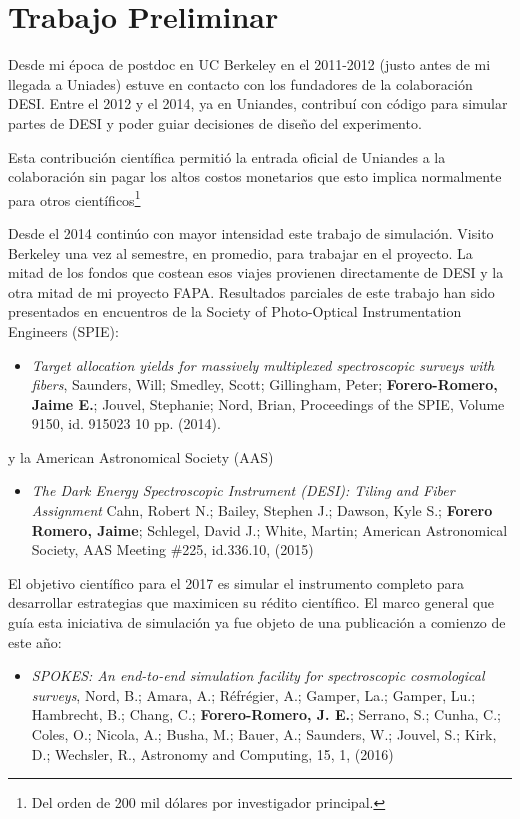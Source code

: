 \documentclass[12pt,spanish]{article}
\begin{document}
\section*{Trabajo Preliminar}

Desde mi \'epoca de postdoc en UC Berkeley en el 2011-2012 (justo
antes de mi llegada a Uniades) estuve en contacto con los fundadores
de la colaboraci\'on DESI. Entre el 2012 y el 2014, ya en Uniandes,
contribu\'i con c\'odigo para simular partes de DESI y poder
guiar decisiones de dise\~no del experimento.  

Esta contribuci\'on cient\'ifica permiti\'o la entrada oficial de
Uniandes a la colaboraci\'on sin pagar los altos costos monetarios que
esto implica normalmente para otros cient\'ificos\footnote{Del orden
  de 200 mil d\'olares por investigador principal.} 

Desde el 2014 contin\'uo con mayor intensidad este trabajo de
simulaci\'on. Visito Berkeley una vez al
semestre, en promedio, para trabajar en el proyecto.
La mitad de los fondos que costean esos viajes provienen directamente
de DESI y la otra mitad de mi proyecto FAPA. 
Resultados parciales de este trabajo han sido presentados en
encuentros de la Society of Photo-Optical Instrumentation Engineers
(SPIE):
\begin{itemize}
\item 
\textit {Target allocation yields for massively multiplexed
  spectroscopic surveys with fibers},  Saunders, Will; Smedley, Scott;
Gillingham, Peter; {\bf Forero-Romero, Jaime E.}; Jouvel, Stephanie; Nord, Brian, 
Proceedings of the SPIE, Volume 9150, id. 915023 10 pp. (2014).
\end{itemize}
%
y la  American Astronomical Society  (AAS)
\begin{itemize}
\item \textit{The Dark Energy Spectroscopic Instrument (DESI): Tiling and Fiber Assignment}
Cahn, Robert N.; Bailey, Stephen J.; Dawson, Kyle S.; {\bf Forero Romero,
Jaime}; Schlegel, David J.; White, Martin;
American Astronomical Society, AAS Meeting \#225, id.336.10, (2015)
\end{itemize}



El objetivo cient\'ifico para el 2017 es simular el instrumento
completo para desarrollar estrategias que maximicen su r\'edito
cient\'ifico. 
El marco general que gu\'ia esta iniciativa de
simulaci\'on ya fue objeto de una publicaci\'on a comienzo de este a\~no:

\begin{itemize}
\item {\it SPOKES: An end-to-end simulation facility for
  spectroscopic cosmological surveys}, 
	Nord, B.; Amara, A.; R\'efr\'egier, A.; Gamper, La.; Gamper, Lu.;
        Hambrecht, B.; Chang, C.; {\bf Forero-Romero, J. E.}; Serrano, S.;
        Cunha, C.; Coles, O.; Nicola, A.; Busha, M.; Bauer, A.;
        Saunders, W.; Jouvel, S.; Kirk, D.; Wechsler, R., Astronomy
        and Computing, 15, 1, (2016)
\end{itemize}
\end{document}

